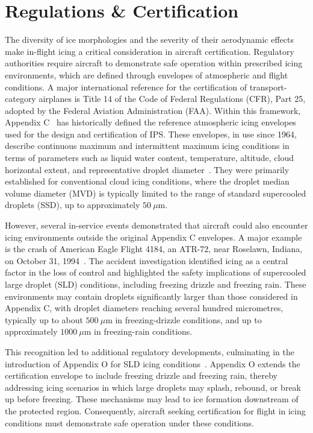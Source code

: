 \section{Regulations \& Certification}\label{sec:RegAndCert}

The diversity of ice morphologies and the severity of their aerodynamic effects make in-flight icing a critical consideration in aircraft certification. Regulatory authorities require aircraft to demonstrate safe operation within prescribed icing environments, which are defined through envelopes of atmospheric and flight conditions. A major international reference for the certification of transport-category airplanes is Title 14 of the Code of Federal Regulations (CFR), Part 25, adopted by the Federal Aviation Administration (FAA). Within this framework, Appendix C~\cite{FAAAppendixC} has historically defined the reference atmospheric icing envelopes used for the design and certification of IPS. These envelopes, in use since 1964, describe continuous maximum and intermittent maximum icing conditions in terms of parameters such as liquid water content, temperature, altitude, cloud horizontal extent, and representative droplet diameter~\cite{jeck2002icing}. They were primarily established for conventional cloud icing conditions, where the droplet median volume diameter (MVD) is typically limited to the range of standard supercooled droplets (SSD), up to approximately $50~\mu\mathrm{m}$.

However, several in-service events demonstrated that aircraft could also encounter icing environments outside the original Appendix C envelopes. A major example is the crash of American Eagle Flight 4184, an ATR-72, near Roselawn, Indiana, on October 31, 1994~\cite{akhurst2002aircraft}. The accident investigation identified icing as a central factor in the loss of control and highlighted the safety implications of supercooled large droplet (SLD) conditions, including freezing drizzle and freezing rain. These environments may contain droplets significantly larger than those considered in Appendix C, with droplet diameters reaching several hundred micrometres, typically up to about $500~\mu\mathrm{m}$ in freezing-drizzle conditions, and up to approximately $1000~\mu\mathrm{m}$ in freezing-rain conditions.

This recognition led to additional regulatory developments, culminating in the introduction of Appendix O for SLD icing conditions~\cite{FAAAppendixO}. Appendix O extends the certification envelope to include freezing drizzle and freezing rain, thereby addressing icing scenarios in which large droplets may splash, rebound, or break up before freezing. These mechanisms may lead to ice formation downstream of the protected region. Consequently, aircraft seeking certification for flight in icing conditions must demonstrate safe operation under these conditions.

